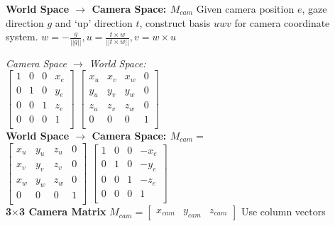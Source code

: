 \documentclass[letterpaper, 8pt]{extarticle}
\begin{document}
\begin{multicols*}{4}
\textbf{World Space $\to$ Camera Space: $M_{cam}$}
Given camera position $e$, gaze direction $g$ and `up' direction $t$, construct basis $uwv$ for camera coordinate system.
$w = - \frac{g}{||g||}, u = \frac{t \times w}{||t \times w||}, v = w \times u$


\textit{Camera Space $\to$ World Space:}\\
\(
\begin{bmatrix}
    1 & 0 & 0 & x_e \\
    0 & 1 & 0 & y_e \\
    0 & 0 & 1 & z_e \\
    0 & 0 & 0 & 1   \\
\end{bmatrix}
\)
\(
\begin{bmatrix}
    x_u & x_v & x_w & 0 \\
    y_u & y_v & y_w & 0 \\
    z_u & z_v & z_w & 0 \\
    0   & 0   & 0   & 1 \\
\end{bmatrix}
\)\\

\textbf{World Space $\to$ Camera Space: $M_{cam}=$}\\
\(
\begin{bmatrix}
    x_u & y_u & z_u & 0 \\
    x_v & y_v & z_v & 0 \\
    x_w & y_w & z_w & 0 \\
    0   & 0   & 0   & 1 \\
\end{bmatrix}
\)
\(
\begin{bmatrix}
    1 & 0 & 0 & -x_e \\
    0 & 1 & 0 & -y_e \\
    0 & 0 & 1 & -z_e \\
    0 & 0 & 0 & 1    \\
\end{bmatrix}
\)
\\

\textbf{3\(\times\)3 Camera Matrix}
\(
M_{cam}
= \begin{bmatrix}
    x_{cam} & y_{cam} & z_{cam}
\end{bmatrix}
\)
Use column vectors


\end{multicols*}
\end{document}
